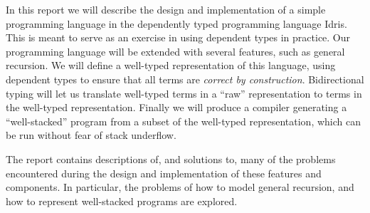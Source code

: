 In this report we will describe the design and implementation of a simple programming language in the dependently typed programming language Idris. This is meant to serve as an exercise in using dependent types in practice. Our programming language will be extended with several features, such as general recursion. We will define a well-typed representation of this language, using dependent types to ensure that all terms are \emph{correct by construction}. Bidirectional typing will let us translate well-typed terms in a ``raw'' representation to terms in the well-typed representation. Finally we will produce a compiler generating a ``well-stacked'' program from a subset of the well-typed representation, which can be run without fear of stack underflow.

The report contains descriptions of, and solutions to, many of the problems encountered during the design and implementation of these features and components. In particular, the problems of how to model general recursion, and how to represent well-stacked programs are explored.
